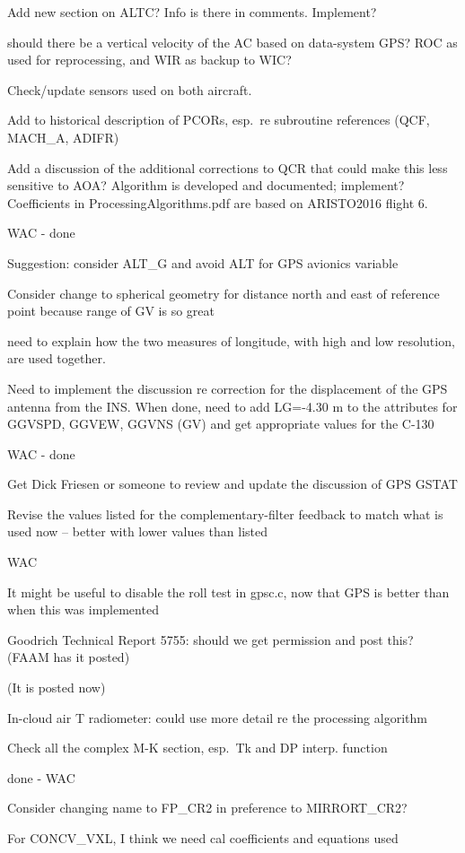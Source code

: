 \documentclass[
  english,
]{book}
\begin{document}
Add new section on ALTC? Info is there in comments. Implement?

should there be a vertical velocity of the AC based on data-system GPS?
ROC as used for reprocessing, and WIR as backup to WIC?

Check/update sensors used on both aircraft.

Add to historical description of PCORs, esp.~re subroutine references
(QCF, MACH\_A, ADIFR)

Add a discussion of the additional corrections to QCR that could make
this less sensitive to AOA? Algorithm is developed and documented;
implement? Coefficients in ProcessingAlgorithms.pdf are based on
ARISTO2016 flight 6.

WAC - done

Suggestion: consider ALT\_G and avoid ALT for GPS avionics variable

Consider change to spherical geometry for distance north and east of
reference point because range of GV is so great

need to explain how the two measures of longitude, with high and low
resolution, are used together.

Need to implement the discussion re correction for the displacement of
the GPS antenna from the INS. When done, need to add LG=-4.30 m to the
attributes for GGVSPD, GGVEW, GGVNS (GV) and get appropriate values for
the C-130

WAC - done

Get Dick Friesen or someone to review and update the discussion of GPS
GSTAT

Revise the values listed for the complementary-filter feedback to match
what is used now -- better with lower values than listed

WAC

It might be useful to disable the roll test in gpsc.c, now that GPS is
better than when this was implemented

Goodrich Technical Report 5755: should we get permission and post this?
(FAAM has it posted)

(It is posted now)

In-cloud air T radiometer: could use more detail re the processing
algorithm

Check all the complex M-K section, esp.~{Tk} and DP interp. function

done - WAC

Consider changing name to FP\_CR2 in preference to MIRRORT\_CR2?

For CONCV\_VXL, I think we need cal coefficients and equations used
\end{document}
